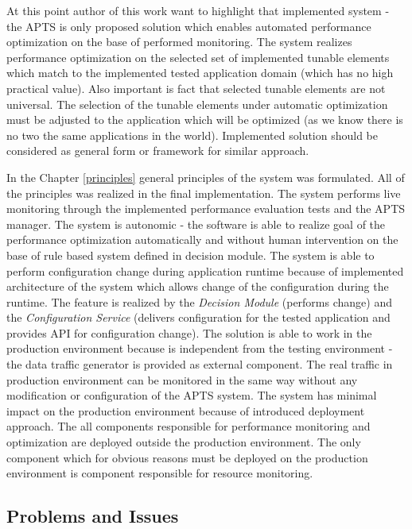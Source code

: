 \documentclass[10pt,a4paper]{article}
\begin{document}
At this point author of this work want to highlight that implemented system - the APTS is only proposed solution which enables automated performance optimization on the base of performed monitoring. The system realizes performance optimization on the selected set of implemented tunable elements which match to the implemented tested application domain (which has no high practical value). Also important is fact that selected tunable elements are not universal. The selection of the tunable elements under automatic optimization must be adjusted to the application which will be optimized (as we know there is no two the same applications in the world). Implemented solution should be considered as general form or framework for similar approach. 

In the Chapter \ref{principles} general principles of the system was formulated. All of the principles was realized in the final implementation. The system performs live monitoring through  the implemented performance evaluation tests and the APTS manager. The system is autonomic - the software is able to realize goal of the performance optimization automatically and without human intervention on the base of rule based system defined in decision module. The system is able to perform configuration change during application runtime because of implemented architecture of the system which allows change of the configuration during the runtime. The feature is realized by the \textit{Decision Module} (performs change) and the \textit{Configuration Service} (delivers configuration for the tested application and provides API for configuration change). The solution is able to work in the production environment because is independent from the testing environment - the data traffic generator is provided as external component. The real traffic in production environment can be monitored in the same way without any modification or configuration of the APTS system. The system has minimal impact on the production environment because of introduced deployment approach. The all components responsible for performance monitoring and optimization are deployed outside the production environment. The only component which for obvious reasons must be deployed on the production environment is component responsible for resource monitoring.  

\subsection{Problems and Issues}
\end{document}
